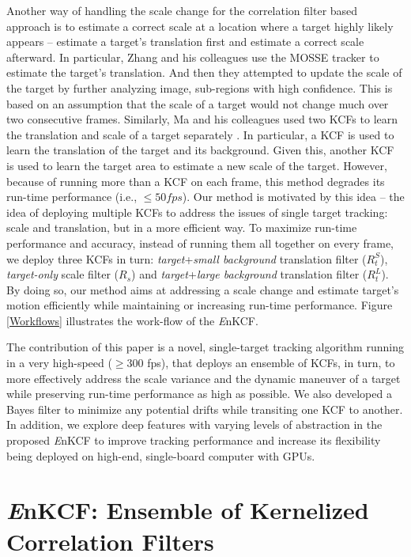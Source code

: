 \documentclass[10pt,twocolumn,letterpaper]{article}
\begin{document}
Another way of handling the scale change for the correlation filter
based approach is to estimate a correct scale at a location where a
target highly likely appears \cite{zhang2014fast} -- estimate a
target's translation first and estimate a correct scale afterward. In
particular, Zhang and his colleagues use the MOSSE tracker \cite{bolme2010visual} to 
estimate the target's translation. And then they attempted to update the scale of
the target by further analyzing image, sub-regions with high
confidence. This is based on an assumption that the scale of a target
would not change much over two consecutive frames. Similarly, Ma and
his colleagues used two KCFs to learn the translation and scale of a
target separately \cite{ma2015long}. In particular, a KCF is used to
learn the translation of the target and its background. Given this,
another KCF is used to learn the target area to estimate a new scale
of the target. However, because of running more than a KCF on each
frame, this method degrades its run-time performance (i.e., $\leq 50
fps$). Our method is motivated by this idea -- the idea of deploying
multiple KCFs to address the issues of single target tracking: scale
and translation, but in a more efficient way. To maximize run-time
performance and accuracy, instead of running them all together on
every frame, we deploy three KCFs in turn:
\textit{target}+\textit{small background} translation filter
($R_{t}^{S}$), \textit{target-only} scale filter ($R_{s}$) and
\textit{target}+\textit{large background} translation filter
($R_{t}^{L}$). By doing so, our method aims at addressing a scale
change and estimate target's motion efficiently while maintaining or
increasing run-time performance. Figure \ref{Workflows} illustrates
the work-flow of the {\it E}nKCF.

The contribution of this paper is a novel, single-target tracking
algorithm running in a very high-speed ($\geq300$ fps), that deploys an
ensemble of KCFs, in turn, to more effectively address the scale
variance and the dynamic maneuver of a target while preserving
run-time performance as high as possible. We also developed a Bayes
filter to minimize any potential drifts while transiting one KCF to
another. In addition, we explore deep features with varying levels of
abstraction in the proposed {\it E}nKCF to improve tracking
performance and increase its flexibility being deployed on high-end,
single-board computer with GPUs.

\section{{\it E}nKCF: Ensemble of Kernelized Correlation Filters}
\end{document}
